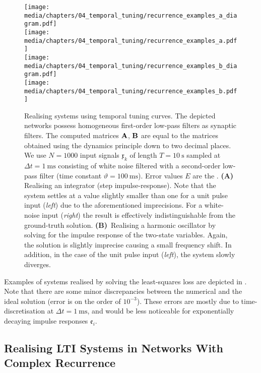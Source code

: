 \begin{figure}[p]
	\centering
	\texttt{[image: media/chapters/04\_temporal\_tuning/recurrence\_examples\_a\_diagram.pdf]}\\[0.5em]
	\texttt{[image: media/chapters/04\_temporal\_tuning/recurrence\_examples\_a.pdf]}\\[1em]
	\texttt{[image: media/chapters/04\_temporal\_tuning/recurrence\_examples\_b\_diagram.pdf]}\\[0.5em]
	\texttt{[image: media/chapters/04\_temporal\_tuning/recurrence\_examples\_b.pdf]}%
	{\label{fig:recurrence_examples_1a}}%
	{\label{fig:recurrence_examples_1b}}%
	\caption[Realising LTI systems using temporal tuning curves]{
		Realising \LTI systems using temporal tuning curves.
		The depicted networks possess homogeneous first-order low-pass filters as synaptic filters.
		The computed matrices $\mathbf{A}$, $\mathbf{B}$ are equal to the matrices obtained using the \NEF dynamics principle down to two decimal places.
		We use $N = 1000$ input signals $\mathfrak{x}_k$ of length $T = \SI{10}{\second}$ sampled at $\Delta t = \SI{1}{\milli\second}$ consisting of white noise filtered with a second-order low-pass filter (time constant $\vartheta = \SI{100}{\milli\second}$).
		Error values $E$ are the \NRMSE.
		\textbf{(A)} Realising an integrator (step impulse-response).
		Note that the system settles at a value slightly smaller than one for a unit pulse input (\emph{left}) due to the aforementioned imprecisions. For a white-noise input (\emph{right}) the result is effectively indistinguishable from the ground-truth solution.
		\textbf{(B)}~Realising a harmonic oscillator by solving for the impulse response of the two-state variables.
		Again, the solution is slightly imprecise causing a small frequency shift.
		In addition, in the case of the unit pulse input (\emph{left}), the system slowly diverges.
	}
	\label{fig:recurrence_examples_1}
\end{figure}

Examples of \LTI systems realised by solving the least-squares loss are depicted in .
Note that there are some minor discrepancies between the numerical and the ideal solution (error is on the order of $10^{-3}$).
These errors are mostly due to time-discretisation at $\Delta t = \SI{1}{\milli\second}$, and would be less noticeable for exponentially decaying impulse responses $\mathfrak{e}_i$.

\newpage

\subsection{Realising LTI Systems in Networks With Complex Recurrence}
\label{sec:lti_complex_networks}

